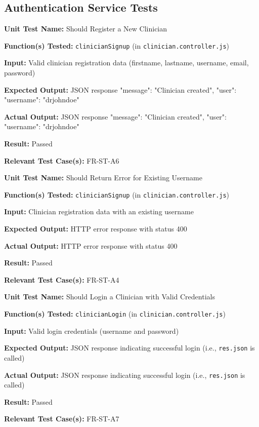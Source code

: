\documentclass[12pt, titlepage]{article}
\begin{document}
\subsection*{Authentication Service Tests}

\begin{mdframed}[linewidth=0.5mm]
\textbf{Unit Test Name:} Should Register a New Clinician \par
\textbf{Function(s) Tested:} \texttt{clinicianSignup} (in \texttt{clinician.controller.js}) \par
\textbf{Input:} Valid clinician registration data (firstname, lastname, username, email, password) \par
\textbf{Expected Output:} JSON response {"message": "Clinician created", "user": {"username": "drjohndoe"}} \par
\textbf{Actual Output:} JSON response {"message": "Clinician created", "user": {"username": "drjohndoe"}} \par
\textbf{Result:} Passed \par
\textbf{Relevant Test Case(s):} FR-ST-A6
\end{mdframed}

\begin{mdframed}[linewidth=0.5mm]
\textbf{Unit Test Name:} Should Return Error for Existing Username \par
\textbf{Function(s) Tested:} \texttt{clinicianSignup} (in \texttt{clinician.controller.js}) \par
\textbf{Input:} Clinician registration data with an existing username \par
\textbf{Expected Output:} HTTP error response with status 400 \par
\textbf{Actual Output:} HTTP error response with status 400 \par
\textbf{Result:} Passed \par
\textbf{Relevant Test Case(s):} FR-ST-A4
\end{mdframed}

\begin{mdframed}[linewidth=0.5mm]
\textbf{Unit Test Name:} Should Login a Clinician with Valid Credentials \par
\textbf{Function(s) Tested:} \texttt{clinicianLogin} (in \texttt{clinician.controller.js}) \par
\textbf{Input:} Valid login credentials (username and password) \par
\textbf{Expected Output:} JSON response indicating successful login (i.e., \texttt{res.json} is called) \par
\textbf{Actual Output:} JSON response indicating successful login (i.e., \texttt{res.json} is called) \par
\textbf{Result:} Passed \par
\textbf{Relevant Test Case(s):} FR-ST-A7
\end{mdframed}
\end{document}
